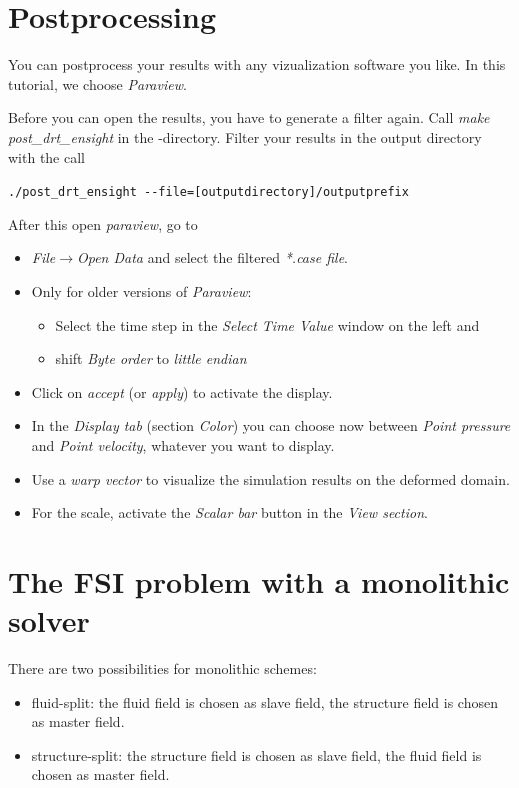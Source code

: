 \section{Postprocessing}
\label{tut_fsi_preexo_2d:postprocess}
You can postprocess your results with any vizualization software you like. In this tutorial, we choose \emph{Paraview}. \newline

Before you can open the results, you have to generate a filter again. Call \emph{make post\_drt\_ensight} in the \baci{}-directory.
Filter your results in the output directory with the call 
\begin{center}
	\verb|./post_drt_ensight --file=[outputdirectory]/outputprefix|
\end{center}
After this open \emph{paraview}, go to

\begin{itemize}
\item \emph{File$\to$Open Data} and select the filtered \emph{{*}.case
file}.
\item Only for older versions of \emph{Paraview}:
  \begin{itemize}
   \item Select the time step in the \emph{Select Time Value} window on the
left and
   \item shift \emph{Byte order} to \emph{little endian}
  \end{itemize}
\item Click on \emph{accept} (or \emph{apply}) to activate the display.
\item In the \emph{Display tab} (section \emph{Color}) you can choose now
between \emph{Point pressure} and \emph{Point velocity}, whatever
you want to display.
\item Use a \emph{warp vector} to visualize the simulation results on the
deformed domain.
\item For the scale, activate the \emph{Scalar bar} button in the \emph{View
section}.
\end{itemize}

\section{The FSI problem with a monolithic solver}
\label{tut_fsi_preexo_2d:monolithic}

There are two possibilities for monolithic schemes:
\begin{itemize}
  \item fluid-split: the fluid field is chosen as slave field, the structure
  field is chosen as master field.
  \item structure-split: the structure field is chosen as slave field, the fluid
  field is chosen as master field.
\end{itemize}

